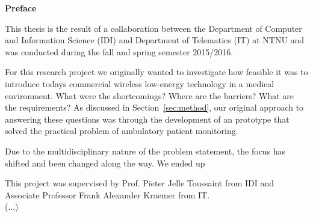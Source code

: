 	\noindent \textbf{Preface}
  \newline
  	
\noindent  
This thesis is the result of a collaboration between the Department of Computer and Information Science (IDI) and Department of Telematics (IT) at NTNU and was conducted during the fall and spring semester 2015/2016.

For this research project we originally wanted to investigate how feasible it was to introduce todays commercial wireless low-energy technology in a medical environment. What were the shortcomings? Where are the barriers? What are the requirements? As discussed in Section~\ref{sec:method}, our original approach to answering these questions was through the development of an prototype that solved the practical problem of ambulatory patient monitoring.

Due to the multidisciplinary nature of the problem statement, the focus has shifted and been changed along the way. We ended up 

This project was supervised by Prof. Pieter Jelle Toussaint from IDI and Associate Professor Frank Alexander Kraemer from IT.
\\
(...)